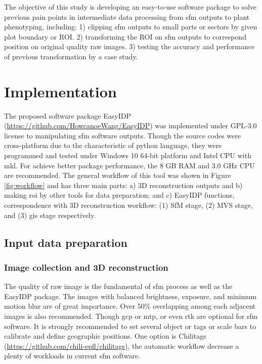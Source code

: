 \documentclass[doublespacing]{configs/bmcart}
\begin{document}
The objective of this study is developing an easy-to-use software package to solve previous pain points in intermediate data processing from \acrshort*{sfm} outputs to plant phenotyping, including: 1) clipping \acrshort*{sfm} outputs to small parts or sectors by given plot boundary or ROI. 2) transforming the ROI on \acrshort*{sfm} outputs to correspond position on original quality raw images. 3) testing the accuracy and performance of previous transformation by a case study.

\section*{Implementation}

The proposed software package EasyIDP (\url{https://github.com/HowcanoeWang/EasyIDP}) was implemented under GPL-3.0 license to manipulating \acrshort*{sfm} software outputs. Though the source codes were cross-platform due to the characteristic of python language, they were programmed and tested under Windows 10 64-bit platform and Intel CPU with \acrfull*{mkl}. For achieve better package performance, the 8 GB RAM and 3.0 GHz CPU are recommended. The general workflow of this tool was shown in Figure \ref{fig:workflow} and has three main parts: a) 3D reconstruction outputs and b) making \acrshort*{roi} by other tools for data preparation; and c) EasyIDP functions, correspondence with 3D reconstruction workflow: (1) SfM stage, (2) MVS stage, and (3) \acrfull*{gis} stage respectively. 

\subsection*{Input data preparation}

\subsubsection*{Image collection and 3D reconstruction}
The quality of raw image is the fundamental of \acrshort*{sfm} process as well as the EasyIDP package. The images with balanced brightness, exposure, and minimum motion blur are of great importance. Over 50\% overlapping among each adjacent images is also recommended. Though \acrfull*{gcp} or \acrfull*{mtp}, or even \acrfull*{rtk} are optional for \acrshort*{sfm} software. It is strongly recommended to set several object or tags or scale bars to calibrate and define geographic positions. One option is Chilitags (\url{https://github.com/chili-epfl/chilitags}), the automatic workflow decrease a plenty of workloads in current \acrshort*{sfm} software.
\end{document}
